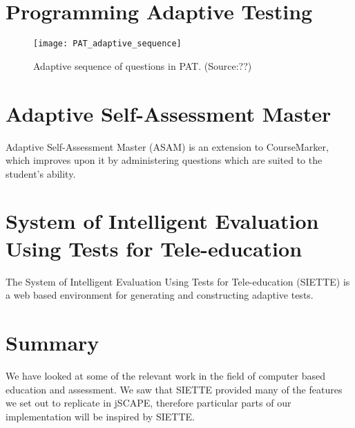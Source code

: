 \section{Programming Adaptive Testing}
\begin{figure}[H]
\centering
\texttt{[image: PAT\_adaptive\_sequence]}
\caption{Adaptive sequence of questions in PAT. (Source:??)}
\label{fig:PAT_adaptive_sequence}
\end{figure}

\section{Adaptive Self-Assessment Master}
Adaptive Self-Assessment Master (ASAM) is an extension to CourseMarker, which improves upon it by administering questions which are suited to the student's ability.

\section{System of Intelligent Evaluation Using Tests for Tele-education}
The System of Intelligent Evaluation Using Tests for Tele-education (SIETTE) is a web based environment for generating and constructing adaptive tests.

\section{Summary}
We have looked at some of the relevant work in the field of computer based education and assessment. We saw that SIETTE provided many of the features we set out to replicate in jSCAPE, therefore particular parts of our implementation will be inspired by SIETTE.